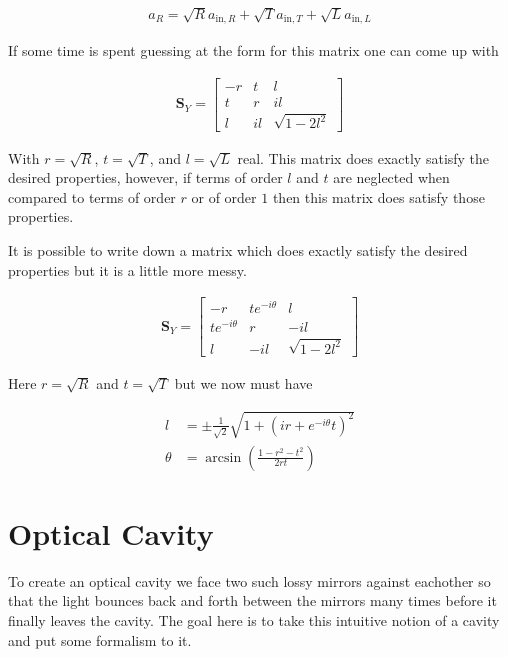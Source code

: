 \documentclass[12pt]{article}
\newcommand{\bv}[1]{\boldsymbol{#1}}
\begin{document}
\begin{align}
a_R = \sqrt{R}a_{\text{in},R} + \sqrt{T}a_{\text{in},T} + \sqrt{L} a_{\text{in},L}
\end{align}

If some time is spent guessing at the form for this matrix one can come up with

\begin{align}
\bv{S}_Y = 
\begin{bmatrix}
-r & t & l \\
t & r & il \\
l & il & \sqrt{1-2l^2}
\end{bmatrix}
\end{align}

With $r = \sqrt{R}$, $t = \sqrt{T}$, and $l = \sqrt{L}$ real. This matrix does exactly satisfy the desired properties, however, if terms of order $l$ and $t$ are neglected when compared to terms of order $r$ or of order $1$ then this matrix does satisfy those properties.

It is possible to write down a matrix which does exactly satisfy the desired properties but it is a little more messy.

\begin{align}
\bv{S}_Y = 
\begin{bmatrix}
-r & t e^{-i\theta}& l\\
te^{-i\theta} & r & -il\\
l & -il & \sqrt{1-2l^2}
\end{bmatrix}
\end{align}

Here $r = \sqrt{R}$ and $t = \sqrt{T}$ but we now must have

\begin{align}
l &= \pm \frac{1}{\sqrt{2}} \sqrt{1 + \left(i r + e^{-i\theta} t\right)^2}\\
\theta &= \arcsin\left(\frac{1-r^2-t^2}{2rt} \right) 
\end{align}

\section{Optical Cavity}

To create an optical cavity we face two such lossy mirrors against eachother so that the light bounces back and forth between the mirrors many times before it finally leaves the cavity. The goal here is to take this intuitive notion of a cavity and put some formalism to it.
\end{document}
